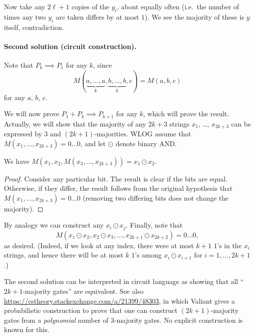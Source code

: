 Now take any $2\ell+1$ copies of the $y_i$, about equally often
(i.e.\ the number of times
any two $y_i$ are taken differs by at most $1$).
We see the majority of these is $y$ itself, contradiction.

\paragraph{Second solution (circuit construction).}
Note that $P_k \implies P_1$ for any $k$, since
\[ M( \underbrace{a,\dots,a}_k, \underbrace{b,\dots,b}_k, c )
  = M(a,b,c) \]
for any $a$, $b$, $c$.

We will now prove $P_1 + P_k \implies P_{k+1}$ for any $k$,
which will prove the result.
Actually, we will show that the majority
of any $2k+3$ strings $x_1$, \dots, $x_{2k+3}$
can be expressed by $3$ and $(2k+1)$-majorities.
WLOG assume that $M(x_1, \dots, x_{2k+3}) = 0\dots0$,
and let $\odot$ denote binary AND.
\begin{claim*}
  We have $M(x_1, x_2, M(x_3, \dots, x_{2k+3})) = x_1 \odot x_2$.
\end{claim*}
\begin{proof}
  Consider any particular bit.
  The result is clear if the bits are equal.
  Otherwise, if they differ,
  the result follows from the original hypothesis that
  $M(x_1, \dots, x_{2k+3}) = 0\dots0$
  (removing two differing bits does not change the majority).
\end{proof}
By analogy we can construct any $x_i \odot x_j$.
Finally, note that
\[ M(x_1 \odot x_2, x_2 \odot x_3, \dots,
  x_{2k+1} \odot x_{2k+2}) = 0\dots0, \]
as desired. (Indeed, if we look at any index,
there were at most $k+1$ $1$'s in the $x_i$ strings,
and hence there will be at most $k$ $1$'s among
$x_i \odot x_{i+1}$ for $i=1,\dots,2k+1$.)

\begin{remark*}
  The second solution can be interpreted in circuit language
  as showing that all ``$2k+1$-majority gates'' are equivalent.
  See also \url{https://cstheory.stackexchange.com/a/21399/48303},
  in which Valiant gives a probabilistic construction to prove
  that one can construct $(2k+1)$-majority gates from a
  \emph{polynomial} number of $3$-majority gates.
  No explicit construction is known for this.
\end{remark*}
